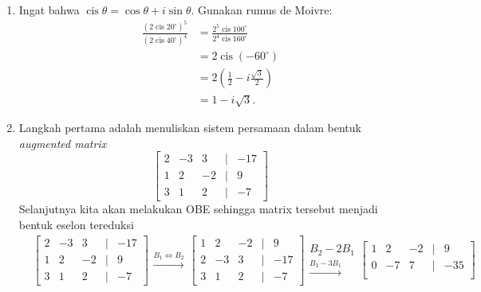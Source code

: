 \documentclass[11pt,a4paper]{article}
\begin{document}
\begin{enumerate}
        \item Ingat bahwa $\operatorname{cis}\theta=\cos\theta+i\sin\theta$. Gunakan rumus de Moivre:
        \begin{align*}
            \frac{(2\operatorname{cis}20^\circ)^5}
                {(2\operatorname{cis}40^\circ)^4}
                &=\frac{2^5\operatorname{cis}100^\circ}
                    {2^4\operatorname{cis}160^\circ}\\
                &=2\operatorname{cis}(-60^\circ)\\
                &=2\left(\frac12-i\frac{\sqrt3}{2}\right)\\
                &=\boxed{1-i\sqrt3}.
        \end{align*}
        \item Langkah pertama adalah menuliskan sistem persamaan dalam bentuk \textit{augmented matrix} 
        \[
        \begin{bmatrix}
            2 & -3 & 3 & | & -17 \\
            1 & 2 & -2 & | & 9 \\
            3 & 1 & 2 & | & -7
        \end{bmatrix}
        \]
        Selanjutnya kita akan melakukan OBE sehingga matrix tersebut menjadi bentuk eselon tereduksi
        \begin{align*}
          &\begin{bmatrix}
              2 & -3 & 3 & | & -17 \\
              1 & 2 & -2 & | & 9 \\
              3 & 1 & 2 & | & -7
          \end{bmatrix}
          \begin{matrix}
              \xrightarrow{B_1 \Leftrightarrow B_2} 
          \end{matrix}
          \begin{bmatrix}
              1 & 2 & -2 & | & 9 \\
              2 & -3 & 3 & | & -17 \\
              3 & 1 & 2 & | & -7
          \end{bmatrix}
          \begin{matrix}
              {\scriptstyle B_2 - 2B_1}\\
              \xrightarrow{B_3-3B_1}
          \end{matrix}
          \begin{bmatrix}
              1 & 2 & -2 & | & 9 \\
              0 & -7 & 7 & | & -35 \\

\end{bmatrix}
\end{align*}
\end{enumerate}
\end{document}
